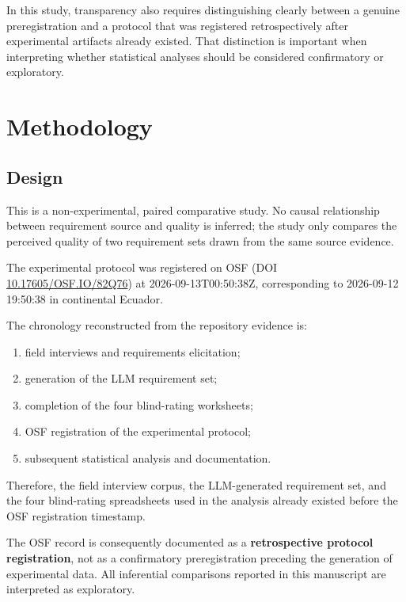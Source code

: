 \documentclass[pdflatex,sn-basic]{sn-jnl}
\begin{document}
In this study, transparency also requires distinguishing clearly between a genuine preregistration and a protocol that was registered retrospectively after experimental artifacts already existed. That distinction is important when interpreting whether statistical analyses should be considered confirmatory or exploratory.

\section{Methodology}

\subsection{Design}

This is a non-experimental, paired comparative study. No causal relationship between requirement source and quality is inferred; the study only compares the perceived quality of two requirement sets drawn from the same source evidence.

The experimental protocol was registered on OSF (DOI \href{https://doi.org/10.17605/OSF.IO/82Q76}{10.17605/OSF.IO/82Q76}) at 2026-09-13T00:50:38Z, corresponding to 2026-09-12 19:50:38 in continental Ecuador.

The chronology reconstructed from the repository evidence is:

\begin{enumerate}[leftmargin=1.2cm]
\item field interviews and requirements elicitation;
\item generation of the LLM requirement set;
\item completion of the four blind-rating worksheets;
\item OSF registration of the experimental protocol;
\item subsequent statistical analysis and documentation.
\end{enumerate}

Therefore, the field interview corpus, the LLM-generated requirement set, and the four blind-rating spreadsheets used in the analysis already existed before the OSF registration timestamp.

The OSF record is consequently documented as a \textbf{retrospective protocol registration}, not as a confirmatory preregistration preceding the generation of experimental data. All inferential comparisons reported in this manuscript are interpreted as exploratory.
\end{document}

